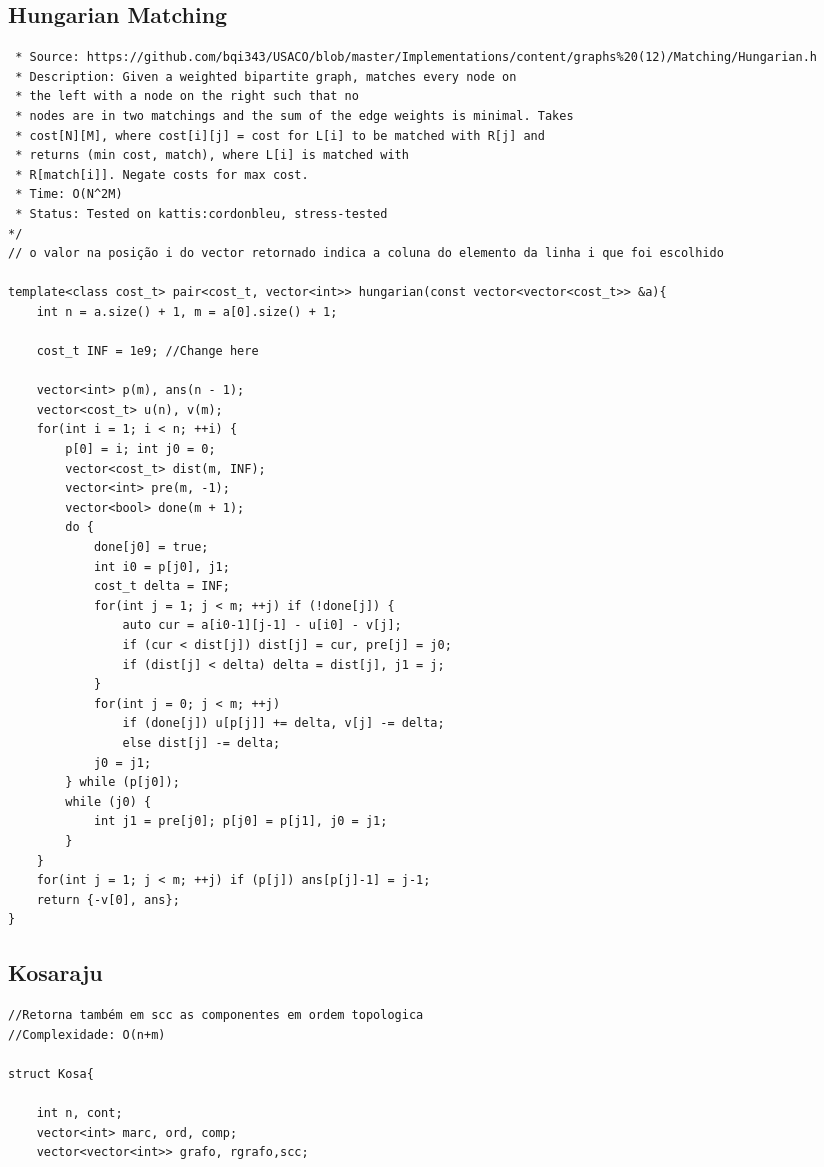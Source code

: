 \documentclass[9pt, a4paper, notitlepage]{extreport}
\begin{document}
\begin{multicols}{3}
\subsection{Hungarian Matching}
\begin{verbatim}
 * Source: https://github.com/bqi343/USACO/blob/master/Implementations/content/graphs%20(12)/Matching/Hungarian.h
 * Description: Given a weighted bipartite graph, matches every node on
 * the left with a node on the right such that no
 * nodes are in two matchings and the sum of the edge weights is minimal. Takes
 * cost[N][M], where cost[i][j] = cost for L[i] to be matched with R[j] and
 * returns (min cost, match), where L[i] is matched with
 * R[match[i]]. Negate costs for max cost.
 * Time: O(N^2M)
 * Status: Tested on kattis:cordonbleu, stress-tested
*/
// o valor na posição i do vector retornado indica a coluna do elemento da linha i que foi escolhido

template<class cost_t> pair<cost_t, vector<int>> hungarian(const vector<vector<cost_t>> &a){
    int n = a.size() + 1, m = a[0].size() + 1;
    
    cost_t INF = 1e9; //Change here

    vector<int> p(m), ans(n - 1);
    vector<cost_t> u(n), v(m); 
	for(int i = 1; i < n; ++i) { 
		p[0] = i; int j0 = 0;
		vector<cost_t> dist(m, INF); 
        vector<int> pre(m, -1); 
		vector<bool> done(m + 1);   
		do {
			done[j0] = true;
			int i0 = p[j0], j1; 
            cost_t delta = INF;
			for(int j = 1; j < m; ++j) if (!done[j]) {
				auto cur = a[i0-1][j-1] - u[i0] - v[j];
				if (cur < dist[j]) dist[j] = cur, pre[j] = j0;
				if (dist[j] < delta) delta = dist[j], j1 = j;
			}
			for(int j = 0; j < m; ++j)
				if (done[j]) u[p[j]] += delta, v[j] -= delta;
				else dist[j] -= delta;
			j0 = j1;
		} while (p[j0]);
		while (j0) { 
			int j1 = pre[j0]; p[j0] = p[j1], j0 = j1;
		}
	}
	for(int j = 1; j < m; ++j) if (p[j]) ans[p[j]-1] = j-1;
	return {-v[0], ans}; 
}
\end{verbatim}

\subsection{Kosaraju}
\begin{verbatim}
//Retorna também em scc as componentes em ordem topologica 
//Complexidade: O(n+m)

struct Kosa{

    int n, cont;
    vector<int> marc, ord, comp;
    vector<vector<int>> grafo, rgrafo,scc;


\end{verbatim}
\end{multicols}
\end{document}
